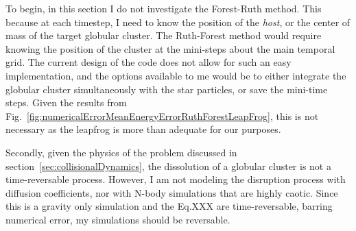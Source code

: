        To begin, in this section I do not investigate the Forest-Ruth method. This because at each timestep, I need to know the position of the \textit{host}, or the center of mass of the target globular cluster. The Ruth-Forest method would require knowing the position of the cluster at the mini-steps about the main temporal grid. The current design of the code does not allow for such an easy implementation, and the options available to me would be to either integrate the globular cluster simultaneously with the star particles, or save the mini-time steps. Given the results from Fig.~\ref{fig:numericalErrorMeanEnergyErrorRuthForestLeapFrog}, this is not necessary as the leapfrog is more than adequate for our purposes. 

        Secondly, given the physics of the problem discussed in section~\ref{sec:collisionalDynamics}, the dissolution of a globular cluster is not a time-reversable process. However, I am not modeling the disruption process with diffusion coefficients, nor with N-body simulations that are highly caotic. Since this is a gravity only simulation and the Eq.XXX are time-reversable, barring numerical error, my simulations should be reversable. 

